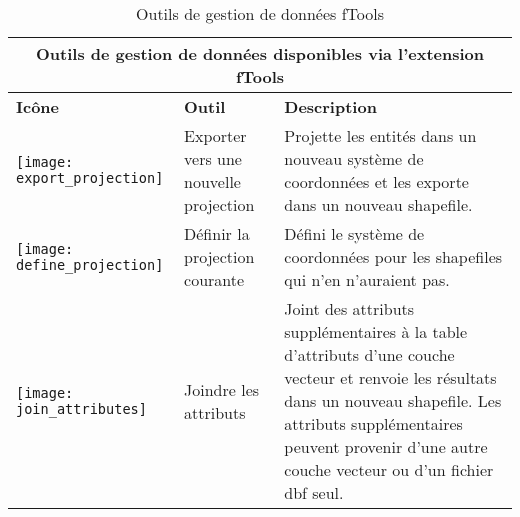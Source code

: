 \begin{table}[ht]
\centering
\caption{Outils de gestion de données fTools}\label{tab:fTool_data_management}\medskip
 \begin{tabular}{|p{0.3in}|p{1.3in}|p{4.6in}|}
 \hline \multicolumn{3}{|c|}{\textbf{Outils de gestion de données disponibles via l'extension fTools}} \\
 \hline \textbf{Icône} & \textbf{Outil} & \textbf{Description} \\
 \hline \texttt{[image: export\_projection]} & Exporter vers une nouvelle projection & Projette les entités dans un nouveau système de coordonnées et les exporte dans un nouveau shapefile. \\
 \hline \texttt{[image: define\_projection]} & Définir la projection courante & Défini le système de coordonnées pour les shapefiles qui n'en n'auraient pas. \\
 \hline \texttt{[image: join\_attributes]} & Joindre les attributs & Joint des attributs supplémentaires à la table d'attributs d'une couche vecteur et renvoie les résultats dans un nouveau shapefile. Les attributs supplémentaires peuvent provenir d'une autre couche vecteur ou d'un fichier dbf seul. \\

\end{tabular}
\end{table}
